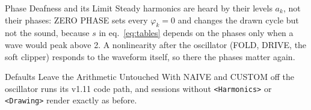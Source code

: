 \documentclass[11pt,letterpaper]{article}
\newcommand{\code}[1]{\texttt{\textcolor{codegray}{#1}}}
\begin{document}
\begin{callout}{Phase Deafness and its Limit}
Steady harmonics are heard by their levels $a_k$, not their phases: ZERO PHASE sets every $\varphi_k = 0$ and changes the drawn cycle
but not the sound, because $s$ in eq.~\eqref{eq:tables} depends on the phases only when a wave would peak above 2. A nonlinearity after
the oscillator (FOLD, DRIVE, the soft clipper) responds to the waveform itself, so there the phases matter again.
\end{callout}

\begin{callout}{Defaults Leave the Arithmetic Untouched}
With NAIVE and CUSTOM off the oscillator runs its v1.11 code path, and sessions without \code{<Harmonics>} or \code{<Drawing>}
render exactly as before.
\end{callout}
\end{document}
